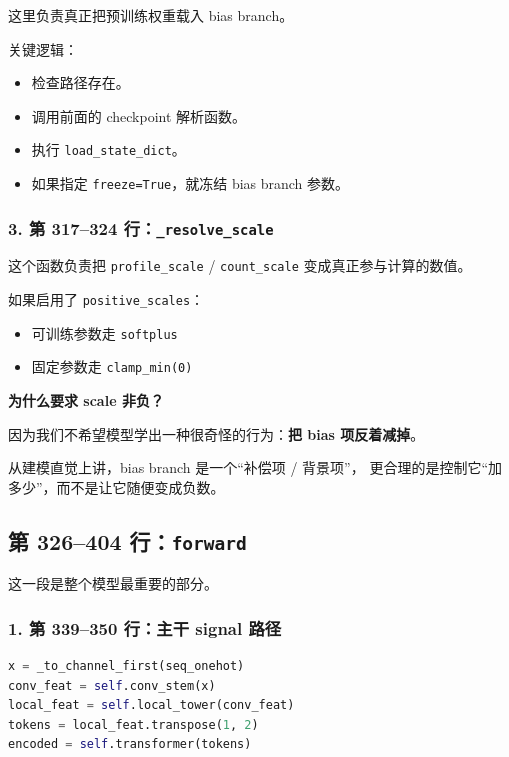 \documentclass[11pt,a4paper]{ctexart}
\begin{document}
这里负责真正把预训练权重载入 bias branch。

关键逻辑：

\begin{itemize}[leftmargin=2em]
\item 检查路径存在。
\item 调用前面的 checkpoint 解析函数。
\item 执行 \texttt{load\_state\_dict}。
\item 如果指定 \texttt{freeze=True}，就冻结 bias branch 参数。
\end{itemize}

\subsubsection*{3. 第 317--324 行：\texttt{\_resolve\_scale}}

这个函数负责把 \texttt{profile\_scale} / \texttt{count\_scale} 变成真正参与计算的数值。

如果启用了 \texttt{positive\_scales}：

\begin{itemize}[leftmargin=2em]
\item 可训练参数走 \texttt{softplus}
\item 固定参数走 \texttt{clamp\_min(0)}
\end{itemize}

\textbf{为什么要求 scale 非负？}

因为我们不希望模型学出一种很奇怪的行为：\textbf{把 bias 项反着减掉}。

从建模直觉上讲，bias branch 是一个“补偿项 / 背景项”，
更合理的是控制它“加多少”，而不是让它随便变成负数。

\subsection{第 326--404 行：\texttt{forward}}

这一段是整个模型最重要的部分。

\subsubsection*{1. 第 339--350 行：主干 signal 路径}

\begin{lstlisting}[language=Python]
x = _to_channel_first(seq_onehot)
conv_feat = self.conv_stem(x)
local_feat = self.local_tower(conv_feat)
tokens = local_feat.transpose(1, 2)
encoded = self.transformer(tokens)
\end{lstlisting}
\end{document}
